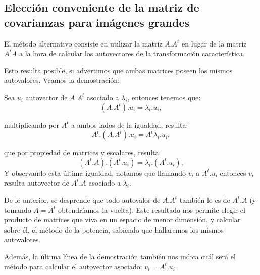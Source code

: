 \subsection{Elección conveniente de la matriz de covarianzas para imágenes grandes}
\label{metodoalternativo}
El método alternativo consiste en utilizar la matriz $A.A^t$ en lugar de la matriz $A^tA$ a la hora de calcular los autovectores de la transformación característica. 
\par
Esto resulta posible, si advertimos que ambas matrices poseen los mismos autovalores. Veamos la demostración:
\par
Sea $u_{i}$ autovector de $A.A^{t}$ asociado a $\lambda_{i}$, entonces tenemos que:
\begin{displaymath}
  (A.A^{t}).u_{i} = \lambda_{i}.u_{i},  
\end{displaymath}
\par
multiplicando por $A^{t}$ a ambos lados de la igualdad, resulta:
\begin{displaymath}
  A^{t}.(A.A^{t}).u_{i} = A^{t}\lambda_{i}.u_{i},  
\end{displaymath}

que por propiedad de matrices y escalares, resulta:
\begin{displaymath}
 (A^{t}.A).(A^{t}.u_{i}) = \lambda_{i}.(A^{t}.u_{i}),  
\end{displaymath}
Y observando esta última igualdad, notamos que llamando $v_{i}$ a $A^{t}.u_{i}$ entonces $v_{i}$ resulta autovector de $A^{t}.A$ asociado a $\lambda_{i}$.
\par
De lo anterior, se desprende que todo autovalor de $A.A^{t}$ también lo es de $A^{t}.A$ (y tomando $A=A^{t}$ obtendríamos la vuelta). Este resultado nos permite elegir el producto de matrices que viva en un espacio de menor dimensión, y calcular sobre él, el método de la potencia, sabiendo que hallaremos los mismos autovalores.
\par
Además, la última línea de la demostración también nos indica cuál será el método para calcular el autovector asociado: $v_{i}=A^{t}.u_{i}$.


